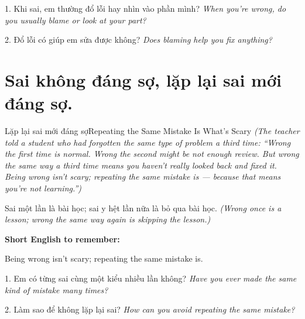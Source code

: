 \begin{tuhocnhanh}
1. Khi sai, em thường đổ lỗi hay nhìn vào phần mình? \textit{When you're wrong, do you usually blame or look at your part?}

2. Đổ lỗi có giúp em sửa được không? \textit{Does blaming help you fix anything?}
\end{tuhocnhanh}
\ngancach

\section{Sai không đáng sợ, lặp lại sai mới đáng sợ.}
\begin{truyen}{Lặp lại sai mới đáng sợ}{Repeating the Same Mistake Is What's Scary}
\textit{(The teacher told a student who had forgotten the same type of problem a third time: ``Wrong the first time is normal. Wrong the second might be not enough review. But wrong the same way a third time means you haven't really looked back and fixed it. Being wrong isn't scary; repeating the same mistake is — because that means you're not learning.'')}
\end{truyen}

\begin{baihoc}
Sai một lần là bài học; sai y hệt lần nữa là bỏ qua bài học.
\textit{(Wrong once is a lesson; wrong the same way again is skipping the lesson.)}
\end{baihoc}

\begin{ghinhoanh}
\textbf{Short English to remember:}

Being wrong isn't scary; repeating the same mistake is.

\end{ghinhoanh}

\begin{tuhocnhanh}
1. Em có từng sai cùng một kiểu nhiều lần không? \textit{Have you ever made the same kind of mistake many times?}

2. Làm sao để không lặp lại sai? \textit{How can you avoid repeating the same mistake?}
\end{tuhocnhanh}
\ngancach

